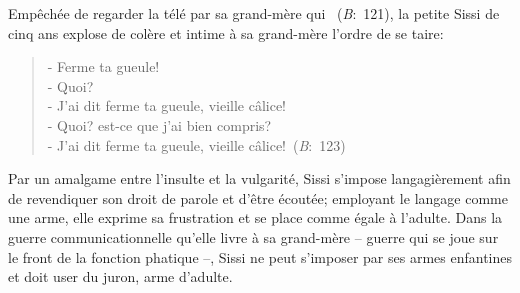 Empêchée de regarder la télé par sa grand-mère qui ~(\textit{B}:~121), la petite Sissi de cinq ans explose de colère et intime à sa grand-mère l'ordre de se taire:
\begin{quote}
  \begin{singlespace}
    \small
    - Ferme ta gueule! \\
    - Quoi?  \\
    - J'ai dit ferme ta gueule, vieille câlice! \\
    - Quoi? est-ce que j'ai bien compris? \\
    - J'ai dit ferme ta gueule, vieille câlice!~(\textit{B}:~123)
    \normalsize
  \end{singlespace}
\end{quote}
Par un amalgame entre l'insulte et la vulgarité, Sissi s'impose langagièrement afin de revendiquer son droit de parole et d'être écoutée; employant le langage comme une arme, elle exprime sa frustration et se place comme égale à l'adulte.
Dans la guerre communicationnelle qu'elle livre à sa grand-mère -- guerre qui se joue sur le front de la fonction phatique --, Sissi ne peut s'imposer par ses armes enfantines et doit user du juron, arme d'adulte.

